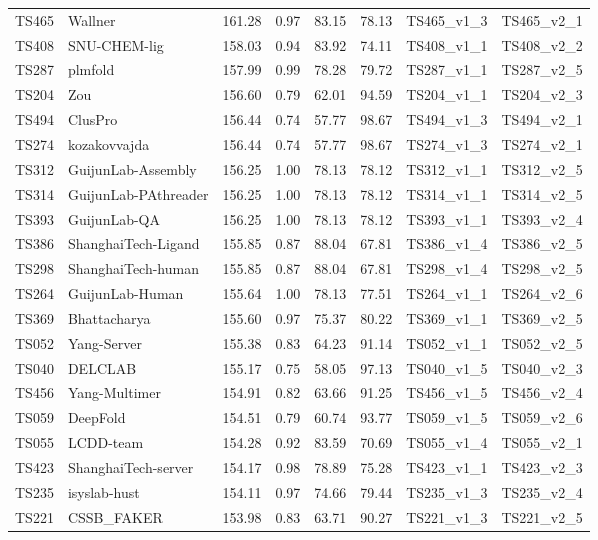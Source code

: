 \begin{table}[ht]
{\begin{tabular}{llllllll}
TS465 & Wallner & 161.28 & 0.97 & 83.15 & 78.13 & TS465\_v1\_3 & TS465\_v2\_1 \\ 
TS408 & SNU-CHEM-lig & 158.03 & 0.94 & 83.92 & 74.11 & TS408\_v1\_1 & TS408\_v2\_2 \\ 
TS287 & plmfold & 157.99 & 0.99 & 78.28 & 79.72 & TS287\_v1\_1 & TS287\_v2\_5 \\ 
TS204 & Zou & 156.60 & 0.79 & 62.01 & 94.59 & TS204\_v1\_1 & TS204\_v2\_3 \\ 
TS494 & ClusPro & 156.44 & 0.74 & 57.77 & 98.67 & TS494\_v1\_3 & TS494\_v2\_1 \\ 
TS274 & kozakovvajda & 156.44 & 0.74 & 57.77 & 98.67 & TS274\_v1\_3 & TS274\_v2\_1 \\ 
TS312 & GuijunLab-Assembly & 156.25 & 1.00 & 78.13 & 78.12 & TS312\_v1\_1 & TS312\_v2\_5 \\ 
TS314 & GuijunLab-PAthreader & 156.25 & 1.00 & 78.13 & 78.12 & TS314\_v1\_1 & TS314\_v2\_5 \\ 
TS393 & GuijunLab-QA & 156.25 & 1.00 & 78.13 & 78.12 & TS393\_v1\_1 & TS393\_v2\_4 \\ 
TS386 & ShanghaiTech-Ligand & 155.85 & 0.87 & 88.04 & 67.81 & TS386\_v1\_4 & TS386\_v2\_5 \\ 
TS298 & ShanghaiTech-human & 155.85 & 0.87 & 88.04 & 67.81 & TS298\_v1\_4 & TS298\_v2\_5 \\ 
TS264 & GuijunLab-Human & 155.64 & 1.00 & 78.13 & 77.51 & TS264\_v1\_1 & TS264\_v2\_6 \\ 
TS369 & Bhattacharya & 155.60 & 0.97 & 75.37 & 80.22 & TS369\_v1\_1 & TS369\_v2\_5 \\ 
TS052 & Yang-Server & 155.38 & 0.83 & 64.23 & 91.14 & TS052\_v1\_1 & TS052\_v2\_5 \\ 
TS040 & DELCLAB & 155.17 & 0.75 & 58.05 & 97.13 & TS040\_v1\_5 & TS040\_v2\_3 \\ 
TS456 & Yang-Multimer & 154.91 & 0.82 & 63.66 & 91.25 & TS456\_v1\_5 & TS456\_v2\_4 \\ 
TS059 & DeepFold & 154.51 & 0.79 & 60.74 & 93.77 & TS059\_v1\_5 & TS059\_v2\_6 \\ 
TS055 & LCDD-team & 154.28 & 0.92 & 83.59 & 70.69 & TS055\_v1\_4 & TS055\_v2\_1 \\ 
TS423 & ShanghaiTech-server & 154.17 & 0.98 & 78.89 & 75.28 & TS423\_v1\_1 & TS423\_v2\_3 \\ 
TS235 & isyslab-hust & 154.11 & 0.97 & 74.66 & 79.44 & TS235\_v1\_3 & TS235\_v2\_4 \\ 
TS221 & CSSB\_FAKER & 153.98 & 0.83 & 63.71 & 90.27 & TS221\_v1\_3 & TS221\_v2\_5 \\ 

\end{tabular}}
\end{table}
